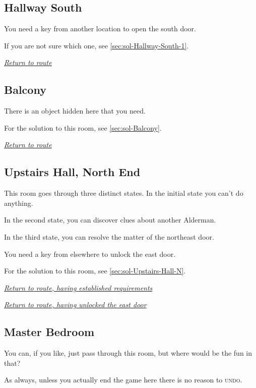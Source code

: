\documentclass[a5paper]{extarticle}
\begin{document}
\newpage
\subsection{Hallway South}\label{sec:req-Hallway-South-1}

You need a key from another location to open the south door.

If you are not sure which one, see \cref{sec:sol-Hallway-South-1}.

\hyperref[sec:route-9]{\emph{Return to route}}

\newpage
\subsection{Balcony}\label{sec:req-Balcony}

There is an object hidden here that you need.

For the solution to this room, see \cref{sec:sol-Balcony}.

\hyperref[sec:route-9]{\emph{Return to route}}

\newpage
\subsection{Upstairs Hall, North End}\label{sec:req-Upstairs-Hall-N}

This room goes through three distinct states.
In the initial state you can't do anything.

In the second state, you can discover clues about another Alderman.

In the third state, you can resolve the matter of the northeast door.

You need a key from elsewhere to unlock the east door.

For the solution to this room, see \cref{sec:sol-Upstairs-Hall-N}.

\hyperref[sec:route-5]{\emph{Return to route, having established requirements}}

\hyperref[sec:route-9]{\emph{Return to route, having unlocked the east door}}

\newpage
\subsection{Master Bedroom}\label{sec:req-Master-Bedroom}

You can, if you like, just pass through this room,
but where would be the fun in that?

As always,
unless you actually end the game here there is no reason to \textsc{undo}.
\end{document}
